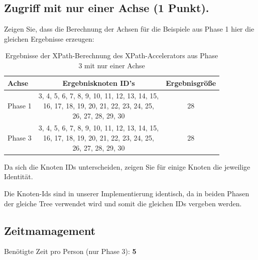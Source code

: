 \documentclass[11pt]{scrartcl}
\begin{document}
\subsection*{Zugriff mit nur einer Achse (1 Punkt).}
Zeigen Sie, dass die Berechnung der Achsen für die Beispiele aus Phase 1 hier die gleichen Ergebnisse erzeugen:

\begin{table}[h]
	\centering
		\begin{center}
			\begin{tabular}{ l | c c }
				\toprule
				Achse & Ergebnisknoten ID's & Ergebnisgröße\\
				\midrule
				Phase 1 &\makecell[l]{3, 4, 5, 6, 7, 8, 9, 10, 11, 12, 13, 14, 15, \\
16, 17, 18, 19, 20, 21, 22, 23, 24, 25, \\
26, 27, 28, 29, 30}
& 28 \\  
Phase 3 &\makecell[l]{3, 4, 5, 6, 7, 8, 9, 10, 11, 12, 13, 14, 15, \\
16, 17, 18, 19, 20, 21, 22, 23, 24, 25, \\
26, 27, 28, 29, 30}
& 28 \\ 
				\bottomrule
			\end{tabular}
			\end{center}
	\caption{Ergebnisse der XPath-Berechnung des XPath-Accelerators aus Phase 3 mit nur einer Achse}
	\label{tab:ErgebnisseDerXPathBerechnug}
\end{table}

Da sich die Knoten IDs unterscheiden, zeigen Sie für einige Knoten die jeweilige Identität.

Die Knoten-Ids sind in unserer Implementierung identisch, da in beiden Phasen der gleiche Tree verwendet wird und somit die gleichen IDs vergeben werden.


\subsection*{Zeitmamagement}

Benötigte Zeit pro Person (nur Phase 3): \textbf{5}
\end{document}
